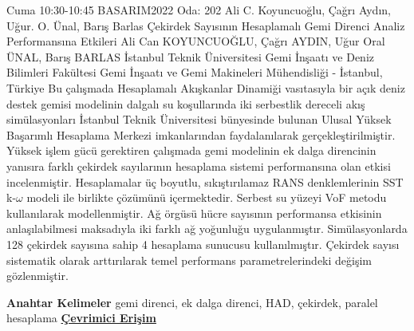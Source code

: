 
    \begin{abstract_basarim}
    {Cuma 10:30-10:45}
    {BASARIM2022}
    {Oda: 202}
    {Ali C. Koyuncuoğlu, Çağrı Aydın, Uğur. O. Ünal, Barış Barlas}
    {Çekirdek Sayısının Hesaplamalı Gemi Direnci Analiz Performansına Etkileri}
    {%
    Ali Can KOYUNCUOĞLU, Çağrı AYDIN, Uğur Oral ÜNAL, Barış BARLAS}
    {%
    }
    {%
    İstanbul Teknik Üniversitesi Gemi İnşaatı ve Deniz Bilimleri Fakültesi Gemi İnşaatı ve Gemi Makineleri Mühendisliği - İstanbul, Türkiye}
    Bu çalışmada Hesaplamalı Akışkanlar Dinamiği vasıtasıyla bir açık deniz destek gemisi modelinin dalgalı su koşullarında iki serbestlik dereceli akış simülasyonları İstanbul Teknik Üniversitesi bünyesinde bulunan Ulusal Yüksek Başarımlı Hesaplama Merkezi imkanlarından faydalanılarak gerçekleştirilmiştir. Yüksek işlem gücü gerektiren çalışmada gemi modelinin ek dalga direncinin yanısıra farklı çekirdek sayılarının hesaplama sistemi performansına olan etkisi incelenmiştir. Hesaplamalar üç boyutlu, sıkıştırılamaz RANS denklemlerinin SST k-$\omega$ modeli ile birlikte çözümünü içermektedir. Serbest su yüzeyi VoF metodu kullanılarak modellenmiştir. Ağ örgüsü hücre sayısının performansa etkisinin anlaşılabilmesi maksadıyla iki farklı ağ yoğunluğu uygulanmıştır. Simülasyonlarda 128 çekirdek sayısına sahip 4 hesaplama sunucusu kullanılmıştır. Çekirdek sayısı sistematik olarak arttırılarak temel performans parametrelerindeki değişim gözlenmiştir. 
    
            \textbf{Anahtar Kelimeler} \newline{}gemi direnci, ek dalga direnci, HAD, çekirdek, paralel hesaplama
     \newline\newline\noindent \href{https://drive.google.com/file/d/1heWAE-2BIuNy_8mBeiCFXe4CtrbaWFkH/view?usp=drivesdk}{\bfseries Çevrimici Erişim}
    \end{abstract_basarim}
    